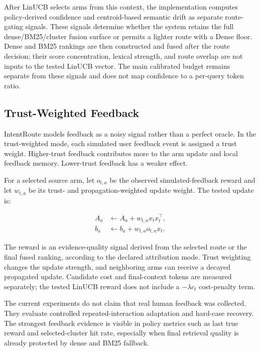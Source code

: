 After LinUCB selects arms from this context, the implementation computes policy-derived confidence and centroid-based semantic drift as separate route-gating signals. These signals determine whether the system retains the full dense/BM25/cluster fusion surface or permits a lighter route with a Dense floor. Dense and BM25 rankings are then constructed and fused after the route decision; their score concentration, lexical strength, and route overlap are not inputs to the tested LinUCB vector. The main calibrated budget remains separate from these signals and does not map confidence to a per-query token ratio.

\subsection{Trust-Weighted Feedback}
\label{sec:04-method:trust-weighted-feedback}

IntentRoute models feedback as a noisy signal rather than a perfect oracle. In the trust-weighted mode, each simulated user feedback event is assigned a trust weight. Higher-trust feedback contributes more to the arm update and local feedback memory. Lower-trust feedback has a weaker effect.

For a selected source arm, let $o_{t,a}$ be the observed simulated-feedback reward and let $w_{t,a}$ be its trust- and propagation-weighted update weight. The tested update is:

\[
\begin{aligned}
A_a &\leftarrow A_a + w_{t,a} x_t x_t^\top, \\
b_a &\leftarrow b_a + w_{t,a} o_{t,a} x_t.
\end{aligned}
\]

The reward is an evidence-quality signal derived from the selected route or the final fused ranking, according to the declared attribution mode. Trust weighting changes the update strength, and neighboring arms can receive a decayed propagated update. Candidate cost and final-context tokens are measured separately; the tested LinUCB reward does not include a $-\lambda c_t$ cost-penalty term.

The current experiments do not claim that real human feedback was collected. They evaluate controlled repeated-interaction adaptation and hard-case recovery. The strongest feedback evidence is visible in policy metrics such as last true reward and selected-cluster hit rate, especially when final retrieval quality is already protected by dense and BM25 fallback.

